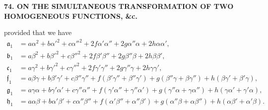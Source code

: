 \documentclass[11pt]{article}
\begin{document}


\begin{center}
\textbf{74. ON THE SIMULTANEOUS TRANSFORMATION OF TWO HOMOGENEOUS FUNCTIONS, \&c.} \quad [pp.~429--431]
\end{center}

\noindent provided that we have
\[
\begin{aligned}
\mathfrak{a}_1 &= a\alpha^2 + b\alpha'^2 + c\alpha''^2 + 2f\alpha'\alpha'' + 2g\alpha''\alpha + 2h\alpha\alpha',\\
\mathfrak{b}_1 &= a\beta^2 + b\beta'^2 + c\beta''^2 + 2f\beta'\beta'' + 2g\beta''\beta + 2h\beta\beta',\\
\mathfrak{c}_1 &= a\gamma^2 + b\gamma'^2 + c\gamma''^2 + 2f\gamma'\gamma'' + 2g\gamma''\gamma + 2h\gamma\gamma',\\
\mathfrak{f}_1 &= a\beta\gamma + b\beta'\gamma' + c\beta''\gamma'' + f(\beta'\gamma'' + \beta''\gamma') + g(\beta''\gamma + \beta\gamma'') + h(\beta\gamma' + \beta'\gamma),\\
\mathfrak{g}_1 &= a\gamma\alpha + b\gamma'\alpha' + c\gamma''\alpha'' + f(\gamma'\alpha'' + \gamma''\alpha') + g(\gamma''\alpha + \gamma\alpha'') + h(\gamma\alpha' + \gamma'\alpha),\\
\mathfrak{h}_1 &= a\alpha\beta + b\alpha'\beta' + c\alpha''\beta'' + f(\alpha'\beta'' + \alpha''\beta') + g(\alpha''\beta + \alpha\beta'') + h(\alpha\beta' + \alpha'\beta).
\end{aligned}
\]
\end{document}
